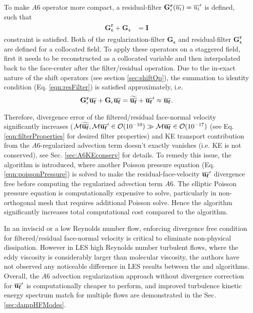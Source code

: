 To make $A6$ operator more compact, a residual-filter $\mathbf{G_{\epsilon}^r}(\overline{u_i}) = {\overline{u_i}}^{\prime}$ is defined, such that
\begin{align}
\begin{split}
\mathbf{G_{\epsilon}^r} + \mathbf{G_{\epsilon}} &= \mathbf{I}
\end{split}
\label{eqn:resFilter}
\end{align}
constraint is satisfied. Both of the regularization-filter $\mathbf{G_{\epsilon}}$ and residual-filter $\mathbf{G_{\epsilon}^r}$ are defined for a collocated field. To apply these operators on a staggered field, first it needs to be reconstructed as a collocated variable and then interpolated back to the face-center after the filter/residual operation. Due to the in-exact nature of the shift operators (see section \ref{sec:shiftOp}), the summation to identity condition (Eq. \eqref{eqn:resFilter}) is satisfied approximately, i.e.
\begin{align}
\mathbf{G_{\epsilon}^r}\overline{\mathbf{u_f}} + \mathbf{G_{\epsilon}}\overline{\mathbf{u_f}} = \widetilde{\overline{\mathbf{u_f}}} + {\overline{\mathbf{u_f}}}^{\prime} \approx \overline{\mathbf{u_f}}.
\end{align} 

Therefore, divergence error of the filtered/residual face-normal velocity significantly increases ($\mathcal{M}\widetilde{\overline{\mathbf{u_f}}}, \mathcal{M}{\overline{\mathbf{u_f}}}^{\prime} \in \mathcal{O}(10^{-10}) \gg \mathcal{M}\overline{\mathbf{u_f}} \in \mathcal{O}(10^{-17})$ (see Eq. \eqref{eqn:filterProperties} for desired filter properties) and KE transport contribution from the $A6$-regularized advection term doesn't exactly vanishes (i.e. KE is not conserved), see Sec. \ref{sec:A6KEconserv} for details. To remedy this issue, the \spaeceAdivFree algorithm is introduced, where another Poisson pressure equation (Eq. \eqref{eqn:poissonPressure}) is solved to make the residual-face-velocity ${\overline{\mathbf{u_f}}}^{\prime}$ divergence free before computing the regularized advection term $ A6$. The elliptic Poisson pressure equation is computationally expensive to solve, particularly in non-orthogonal mesh that requires additional Poisson solve. Hence the \spaeceAdivFree algorithm significantly increases total computational cost compared to the \spaeceA algorithm. 

In an inviscid or a low Reynolds number flow, enforcing divergence free condition for filtered/residual face-normal velocity is critical to eliminate non-physical dissipation. However in LES high Reynolds number turbulent flows, where the eddy viscosity is considerably larger than molecular viscosity, the authors have not observed any noticeable difference in LES results between the \spaeceAdivFree and \spaeceA algorithms. Overall, the $A6$ advection regularization approach without divergence correction for ${\overline{\mathbf{u_f}}}^{\prime}$ is computationally cheaper to perform, and improved turbulence kinetic energy spectrum match for multiple flows are demonstrated in the Sec. \ref{sec:dampHFModes}.


